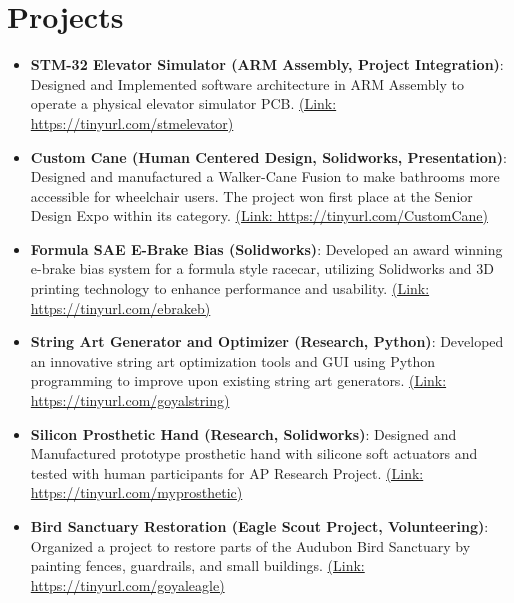 \documentclass[letterpaper,10pt]{article}
\newcommand{\resumeItem}[2]{
  \item\small{
    \textbf{#1}{: #2 \vspace{-2pt}}
  }
}
\newcommand{\resumeSubItem}[2]{\resumeItem{#1}{#2}\vspace{-3pt}}
\newcommand{\resumeSubHeadingListStart}{\begin{itemize}[leftmargin=*]}
\newcommand{\resumeSubHeadingListEnd}{\end{itemize}}
\begin{document}
\section{Projects}
  \resumeSubHeadingListStart
    \resumeSubItem{STM-32 Elevator Simulator (ARM Assembly, Project Integration)}
    {Designed and Implemented software architecture in ARM Assembly to operate a physical elevator simulator PCB. \href{https://tinyurl.com/stmelevator}{(Link: https://tinyurl.com/stmelevator)}}
\vspace{2pt}
    \resumeSubItem{Custom Cane (Human Centered Design, Solidworks, Presentation)}
    {Designed and manufactured a Walker-Cane Fusion to make bathrooms more accessible for wheelchair users. The project won first place at the Senior Design Expo within its category. \href{https://tinyurl.com/CustomCane}{(Link: https://tinyurl.com/CustomCane)}}
\vspace{2pt}
    \resumeSubItem{Formula SAE E-Brake Bias (Solidworks)}
    {Developed an award winning e-brake bias system for a formula style racecar, utilizing Solidworks and 3D printing technology to enhance performance and usability.  \href{https://tinyurl.com/ebrakeb}{(Link: https://tinyurl.com/ebrakeb)}}
\vspace{2pt}
    \resumeSubItem{String Art Generator and Optimizer (Research, Python)}
    {Developed an innovative string art optimization tools and GUI using Python programming to improve upon existing string art generators. \href{https://tinyurl.com/goyalstring}{(Link: https://tinyurl.com/goyalstring)}}
\vspace{2pt}
    \resumeSubItem{Silicon Prosthetic Hand (Research, Solidworks)}
    {Designed and Manufactured prototype prosthetic hand with silicone soft actuators and tested with human participants for AP Research Project. \href{https://tinyurl.com/myprosthetic}{(Link: https://tinyurl.com/myprosthetic)}}
\vspace{2pt}
    \resumeSubItem{Bird Sanctuary Restoration (Eagle Scout Project, Volunteering)}
    {Organized a project to restore parts of the Audubon Bird Sanctuary by painting fences, guardrails, and small buildings. \href{https://tinyurl.com/goyaleagle}{(Link: https://tinyurl.com/goyaleagle)}}
  \resumeSubHeadingListEnd
\vspace{-5pt}

\end{document}
